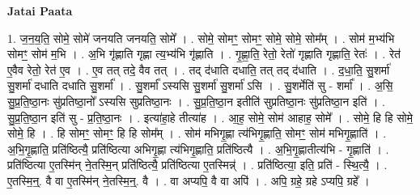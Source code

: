 \documentclass[17pt]{extarticle}
\begin{document}
\textbf{Jatai Paata} \newline

1. ज॒न॒य॒ति॒ सोमे॒ सोमे॑ जनयति जनयति॒ सोमे᳚ । . सोमे॒ सोमꣳ॒॒ सोमꣳ॒॒ सोमे॒ सोमे॒ सोम᳚म् । . सोम॑ म॒भ्य॑भि सोमꣳ॒॒ सोम॑ म॒भि । . अ॒भि गृ॑ह्णाति गृह्णा त्य॒भ्य॑भि गृ॑ह्णाति । . गृ॒ह्णा॒ति॒ रेतो॒ रेतो॑ गृह्णाति गृह्णाति॒ रेतः॑ । . रेत॑ ए॒वैव रेतो॒ रेत॑ ए॒व । . ए॒व तत् तदे॒ वैव तत् । . तद् द॑धाति दधाति॒ तत् तद् द॑धाति । . द॒धा॒ति॒ सु॒शर्मा॑ सु॒शर्मा॑ दधाति दधाति सु॒शर्मा᳚ । . सु॒शर्मा᳚ ऽस्यसि सु॒शर्मा॑ सु॒शर्मा॑ ऽसि । . सु॒शर्मेति॑ सु - शर्मा᳚ । . अ॒सि॒ सु॒प्र॒ति॒ष्ठा॒नः सु॑प्रतिष्ठा॒नो᳚ ऽस्यसि सुप्रतिष्ठा॒नः । . सु॒प्र॒ति॒ष्ठा॒न इतीति॑ सुप्रतिष्ठा॒नः सु॑प्रतिष्ठा॒न इति॑ । . सु॒प्र॒ति॒ष्ठा॒न इति॑ सु - प्र॒ति॒ष्ठा॒नः । . इत्या॑हा॒हे तीत्या॑ह । . आ॒ह॒ सोमे॒ सोम॑ आहाह॒ सोमे᳚ । . सोमे॒ हि हि सोमे॒ सोमे॒ हि । . हि सोमꣳ॒॒ सोमꣳ॒॒ हि हि सोम᳚म् । . सोम॑ मभिगृ॒ह्णा त्य॑भिगृ॒ह्णाति॒ सोमꣳ॒॒ सोम॑ मभिगृ॒ह्णाति॑ । . अ॒भि॒गृ॒ह्णाति॒ प्रति॑ष्ठित्यै॒ प्रति॑ष्ठित्या अभिगृ॒ह्णा त्य॑भिगृ॒ह्णाति॒ प्रति॑ष्ठित्यै । . अ॒भि॒गृ॒ह्णातीत्य॑भि - गृ॒ह्णाति॑ । . प्रति॑ष्ठित्या ए॒तस्मि॑न् ने॒तस्मि॒न् प्रति॑ष्ठित्यै॒ प्रति॑ष्ठित्या ए॒तस्मिन्न्॑ । . प्रति॑ष्ठित्या॒ इति॒ प्रति॑ - स्थि॒त्यै॒ । . ए॒तस्मि॒न्॒. वै वा ए॒तस्मि॑न् ने॒तस्मि॒न्॒. वै । . वा अप्यपि॒ वै वा अपि॑ । . अपि॒ ग्रहे॒ ग्रहे ऽप्यपि॒ ग्रहे᳚ । \newline
\end{document}
